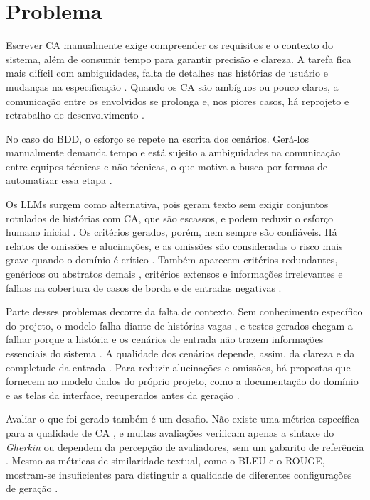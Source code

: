 \section{Problema}
\label{sec:problema}

Escrever CA manualmente exige compreender os requisitos e o contexto do sistema, além de consumir tempo para garantir precisão e clareza. A tarefa fica mais difícil com ambiguidades, falta de detalhes nas histórias de usuário e mudanças na especificação \cite{wang2025}. Quando os CA são ambíguos ou pouco claros, a comunicação entre os envolvidos se prolonga e, nos piores casos, há reprojeto e retrabalho de desenvolvimento \cite{rawson2025}.

No caso do BDD, o esforço se repete na escrita dos cenários. Gerá-los manualmente demanda tempo e está sujeito a ambiguidades na comunicação entre equipes técnicas e não técnicas, o que motiva a busca por formas de automatizar essa etapa \cite{matveeva2025}.

Os LLMs surgem como alternativa, pois geram texto sem exigir conjuntos rotulados de histórias com CA, que são escassos, e podem reduzir o esforço humano inicial \cite{li2024}. Os critérios gerados, porém, nem sempre são confiáveis. Há relatos de omissões e alucinações, e as omissões são consideradas o risco mais grave quando o domínio é crítico \cite{hassani2026}. Também aparecem critérios redundantes, genéricos ou abstratos demais \cite{wang2025}, critérios extensos e informações irrelevantes \cite{li2024} e falhas na cobertura de casos de borda e de entradas negativas \cite{wang2025,zyberaj2026}.

Parte desses problemas decorre da falta de contexto. Sem conhecimento específico do projeto, o modelo falha diante de histórias vagas \cite{li2024}, e testes gerados chegam a falhar porque a história e os cenários de entrada não trazem informações essenciais do sistema \cite{ferreira2025}. A qualidade dos cenários depende, assim, da clareza e da completude da entrada \cite{matveeva2025}. Para reduzir alucinações e omissões, há propostas que fornecem ao modelo dados do próprio projeto, como a documentação do domínio e as telas da interface, recuperados antes da geração \cite{wang2025}.

Avaliar o que foi gerado também é um desafio. Não existe uma métrica específica para a qualidade de CA \cite{li2024}, e muitas avaliações verificam apenas a sintaxe do \textit{Gherkin} \cite{karpurapu2024,huang2026} ou dependem da percepção de avaliadores, sem um gabarito de referência \cite{hassani2026}. Mesmo as métricas de similaridade textual, como o BLEU e o ROUGE, mostram-se insuficientes para distinguir a qualidade de diferentes configurações de geração \cite{wang2025}.


